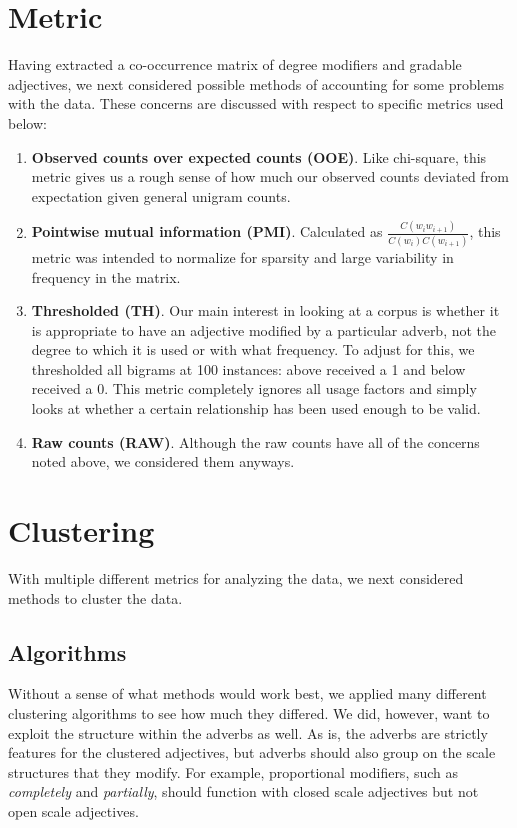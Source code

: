 \documentclass[11pt]{amsart}
\begin{document}
\section{Metric}
Having extracted a co-occurrence matrix of degree modifiers and gradable adjectives, we next considered possible methods of accounting for some problems with the data. These concerns are discussed with respect to specific metrics used below:
\begin{enumerate}
\item \textbf{Observed counts over expected counts (OOE)}. Like chi-square, this metric gives us a rough sense of how much our observed counts deviated from expectation given general unigram counts. 
\item \textbf{Pointwise mutual information (PMI)}. Calculated as $\frac{C(w_i w_{i+1})}{C(w_i)C(w_{i + 1})}$, this metric was intended to normalize for sparsity and large variability in frequency in the matrix.
\item \textbf{Thresholded (TH)}. Our main interest in looking at a corpus is whether it is appropriate to have an adjective modified by a particular adverb, not the degree to which it is used or with what frequency. To adjust for this, we thresholded all bigrams at 100 instances: above received a 1 and below received a 0. This metric completely ignores all usage factors and simply looks at whether a certain relationship has been used enough to be valid.
\item \textbf{Raw counts (RAW)}. Although the raw counts have all of the concerns noted above, we considered them anyways.
\end{enumerate}
\section{Clustering}
With multiple different metrics for analyzing the data, we next considered methods to cluster the data.
\subsection{Algorithms}
Without a sense of what methods would work best, we applied many different clustering algorithms to see how much they differed. We did, however, want to exploit the structure within the adverbs as well. As is, the adverbs are strictly features for the clustered adjectives, but adverbs should also group on the scale structures that they modify. For example, proportional modifiers, such as \textit{completely} and \textit{partially}, should function with closed scale adjectives but not open scale adjectives.
\end{document}
